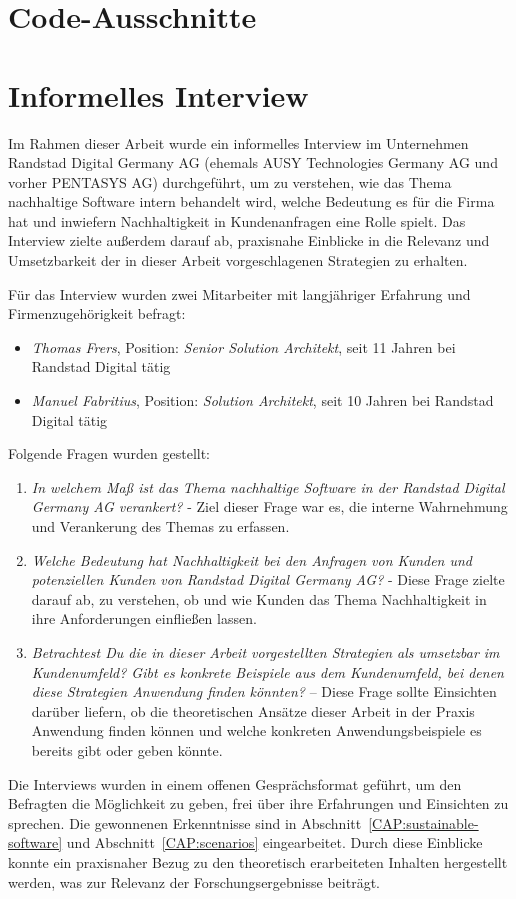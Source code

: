 \chapter{Code-Ausschnitte}




\chapter{Informelles Interview}\label{CAP:interview}
\noindent Im Rahmen dieser Arbeit wurde ein informelles Interview im Unternehmen Randstad Digital Germany AG (ehemals AUSY Technologies Germany AG und vorher PENTASYS AG) durchgeführt, um zu verstehen, wie das Thema nachhaltige Software intern behandelt wird, welche Bedeutung es für die Firma hat und inwiefern Nachhaltigkeit in Kundenanfragen eine Rolle spielt.
Das Interview zielte außerdem darauf ab, praxisnahe Einblicke in die Relevanz und Umsetzbarkeit der in dieser Arbeit vorgeschlagenen Strategien zu erhalten.

Für das Interview wurden zwei Mitarbeiter mit langjähriger Erfahrung und Firmenzugehörigkeit befragt:
\begin{itemize}
    \item \textit{Thomas Frers}, Position: \textit{Senior Solution Architekt}, seit 11 Jahren bei Randstad Digital tätig
    \item \textit{Manuel Fabritius}, Position: \textit{Solution Architekt}, seit 10 Jahren bei Randstad Digital tätig
\end{itemize}
Folgende Fragen wurden gestellt:
\begin{enumerate}
    \item \textit{\glqq In welchem Maß ist das Thema nachhaltige Software in der Randstad Digital Germany AG verankert?\grqq{}} - Ziel dieser Frage war es, die interne Wahrnehmung und Verankerung des Themas zu erfassen.
    \item \textit{\glqq Welche Bedeutung hat Nachhaltigkeit bei den Anfragen von Kunden und potenziellen Kunden von Randstad Digital Germany AG?\grqq{}} - Diese Frage zielte darauf ab, zu verstehen, ob und wie Kunden das Thema Nachhaltigkeit in ihre Anforderungen einfließen lassen.
    \item \textit{\glqq Betrachtest Du die in dieser Arbeit vorgestellten Strategien als umsetzbar im Kundenumfeld? Gibt es konkrete Beispiele aus dem Kundenumfeld, bei denen diese Strategien Anwendung finden könnten?\grqq{}} – Diese Frage sollte Einsichten darüber liefern, ob die theoretischen Ansätze dieser Arbeit in der Praxis Anwendung finden können und welche konkreten Anwendungsbeispiele es bereits gibt oder geben könnte.
\end{enumerate}
Die Interviews wurden in einem offenen Gesprächsformat geführt, um den Befragten die Möglichkeit zu geben, frei über ihre Erfahrungen und Einsichten zu sprechen.
Die gewonnenen Erkenntnisse sind in Abschnitt~\ref{CAP:sustainable-software} und Abschnitt~\ref{CAP:scenarios} eingearbeitet.
Durch diese Einblicke konnte ein praxisnaher Bezug zu den theoretisch erarbeiteten Inhalten hergestellt werden, was zur Relevanz der Forschungsergebnisse beiträgt.
